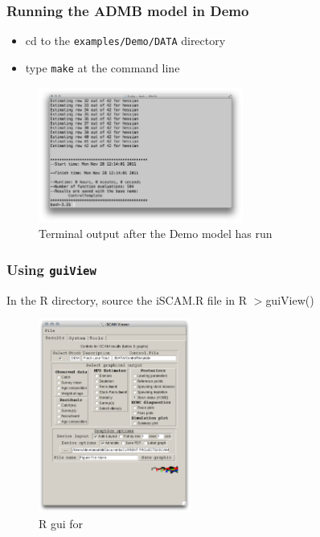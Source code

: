 \begin{frame}
	\frametitle{Running the ADMB model in Demo}
	\begin{itemize}
		\item cd to the \texttt{examples/Demo/DATA} directory
		\item type \texttt{make} at the command line
	\end{itemize}
	\begin{figure}[htbp]
		\centering
			\includegraphics[height=1.75in]{screenCaptures/Term-catage.pdf}
		\caption{Terminal output after the Demo model has run}
		\label{fig:screenCaptures_Term-catage}
	\end{figure}
	
\end{frame}

\begin{frame}
	\frametitle{Using \texttt{guiView}}
	In the R directory, source the iSCAM.R file in R $>$guiView()
	\begin{figure}[htbp]
		\centering
			\includegraphics[height=2.5in]{screenCaptures/guiView.pdf}
		\caption{R gui for \iscam}
		\label{fig:screenCaptures_guiView}
	\end{figure}
	
\end{frame}
